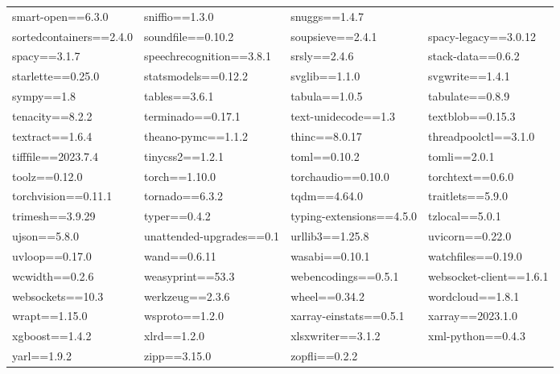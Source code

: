\begin{tabular}{l l l l}
smart-open==6.3.0 & sniffio==1.3.0 & snuggs==1.4.7 \\ sortedcontainers==2.4.0 & soundfile==0.10.2 & soupsieve==2.4.1 & spacy-legacy==3.0.12 \\ 
spacy==3.1.7 & speechrecognition==3.8.1 & srsly==2.4.6 & stack-data==0.6.2 \\ starlette==0.25.0 & statsmodels==0.12.2 & svglib==1.1.0 & 
svgwrite==1.4.1 \\ sympy==1.8 & tables==3.6.1 & tabula==1.0.5 & tabulate==0.8.9 \\ tenacity==8.2.2 & terminado==0.17.1 & 
text-unidecode==1.3 & textblob==0.15.3 \\ textract==1.6.4 & theano-pymc==1.1.2 & thinc==8.0.17 & threadpoolctl==3.1.0 \\ tifffile==2023.7.4 & 
tinycss2==1.2.1 & toml==0.10.2 & tomli==2.0.1 \\ toolz==0.12.0 & torch==1.10.0 & torchaudio==0.10.0 & torchtext==0.6.0 \\ 
torchvision==0.11.1 & tornado==6.3.2 & tqdm==4.64.0 & traitlets==5.9.0 \\ trimesh==3.9.29 & typer==0.4.2 & typing-extensions==4.5.0 & 
tzlocal==5.0.1 \\ ujson==5.8.0 & unattended-upgrades==0.1 & urllib3==1.25.8 & uvicorn==0.22.0 \\ uvloop==0.17.0 & wand==0.6.11 & 
wasabi==0.10.1 & watchfiles==0.19.0 \\ wcwidth==0.2.6 & weasyprint==53.3 & webencodings==0.5.1 & websocket-client==1.6.1 \\ websockets==10.3 & 
werkzeug==2.3.6 & wheel==0.34.2 & wordcloud==1.8.1 \\ wrapt==1.15.0 & wsproto==1.2.0 & xarray-einstats==0.5.1 & xarray==2023.1.0 \\ 
xgboost==1.4.2 & xlrd==1.2.0 & xlsxwriter==3.1.2 & xml-python==0.4.3 \\ yarl==1.9.2 & zipp==3.15.0 & zopfli==0.2.2 \\
\end{tabular}
\normalsize